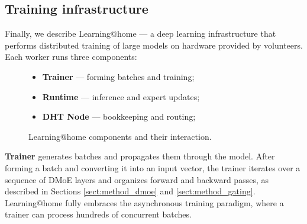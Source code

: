 \subsection{Training infrastructure}\label{sect:method_athome}
\vspace{-2px}

Finally, we describe Learning@home --- a deep learning infrastructure that performs distributed training of large models on hardware provided by volunteers. Each worker runs three components:

\begin{figure}[h!]
\vspace{-6px}
    \begin{minipage}{0.45\linewidth}
    \begin{itemize}[leftmargin=*]
        \item \textbf{Trainer} --- forming batches and training;
        \item \textbf{Runtime} --- inference and expert updates;
        \item \textbf{DHT Node} --- bookkeeping and routing;
    \end{itemize}\end{minipage}\begin{minipage}{0.55\linewidth}
        \centering{}
    \end{minipage}
    \caption{Learning@home components and their interaction.}
    \vspace{-12pt}
    \label{fig:dmoe}
\end{figure}


\textbf{Trainer} generates batches and propagates them through the model. After forming a batch and converting it into an input vector, the trainer iterates over a sequence of DMoE layers and organizes forward and backward passes, as described in Sections \ref{sect:method_dmoe} and \ref{sect:method_gating}. Learning@home fully embraces the asynchronous training paradigm, where a trainer can process hundreds of concurrent batches.

\vspace{-1px}

